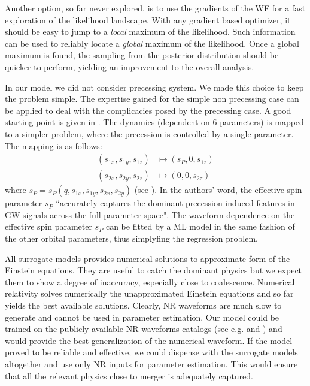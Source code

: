\par
Another option, so far never explored, is to use the gradients of the WF for a fast exploration of the likelihood landscape. With any gradient based optimizer, it should be easy to jump to a \textit{local} maximum of the likelihood. Such information can be used to reliably locate a \textit{global} maximum of the likelihood. Once a global maximum is found, the sampling from the posterior distribution should be quicker to perform, yielding an improvement to the overall analysis.
\par
In our model we did not consider precessing system. We made this choice to keep the problem simple.
The expertise gained for the simple non precessing case can be applied to deal with the complicacies posed by the precessing case.
A good starting point is given in \cite{Schmidt2015Precession}. The dynamics (dependent on 6 parameters) is mapped to a simpler problem, where the precession is controlled by a single parameter. The mapping is as follows:
\begin{align*}
	(s_{1x},s_{1y}, s_{1z}) &\longmapsto (s_{P},0, s_{1z})\\
	(s_{2x},s_{2y}, s_{2z}) &\longmapsto (0, 0, s_{2z})
\end{align*}
where $s_P = s_P(q,s_{1x},s_{1y}, s_{2x},s_{2y})$ (see \cite[eq. 3]{Schmidt2015Precession}).
In the authors' word, the effective spin parameter $s_{P}$ ``accurately captures the dominant precession-induced features in GW signals across the full parameter space".
The waveform dependence on the effective spin parameter $s_P$ can be fitted by a ML model in the same fashion of the other orbital parameters, thus simplyfing the regression problem.
\par
All surrogate models provides numerical solutions to approximate form of the Einstein equations. They are useful to catch the dominant physics but we expect them to show a degree of inaccuracy, especially close to coalescence.
Numerical relativity solves numerically the unapproximated Einstein equations and so far yields the best available solutions.
Clearly, NR waveforms are much slow to generate and cannot be used in parameter estimation.
Our model could be trained on the publicly available NR waveforms catalogs (see e.g. \cite{Mroue2013NRWFcatalog} and \cite{Healy2017NRWFcatalog}) and would provide the best generalization of the numerical waveform.
If the model proved to be reliable and effective, we could dispense with the surrogate models altogether and use only NR inputs for parameter estimation. This would ensure that all the relevant physics close to merger is adequately captured.
